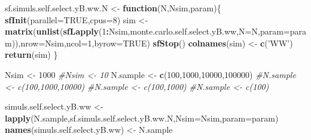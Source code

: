 \documentclass[]{book}
\newenvironment{Shaded}{\begin{snugshade}}{\end{snugshade}}
\newcommand{\KeywordTok}[1]{\textcolor[rgb]{0.13,0.29,0.53}{\textbf{#1}}}
\newcommand{\DataTypeTok}[1]{\textcolor[rgb]{0.13,0.29,0.53}{#1}}
\newcommand{\DecValTok}[1]{\textcolor[rgb]{0.00,0.00,0.81}{#1}}
\newcommand{\StringTok}[1]{\textcolor[rgb]{0.31,0.60,0.02}{#1}}
\newcommand{\CommentTok}[1]{\textcolor[rgb]{0.56,0.35,0.01}{\textit{#1}}}
\newcommand{\OtherTok}[1]{\textcolor[rgb]{0.56,0.35,0.01}{#1}}
\newcommand{\ControlFlowTok}[1]{\textcolor[rgb]{0.13,0.29,0.53}{\textbf{#1}}}
\newcommand{\OperatorTok}[1]{\textcolor[rgb]{0.81,0.36,0.00}{\textbf{#1}}}
\newcommand{\NormalTok}[1]{#1}
\theoremstyle{definition}
\theoremstyle{definition}
\theoremstyle{definition}
\theoremstyle{remark}
\begin{document}
\begin{Shaded}
\begin{Highlighting}[]
\NormalTok{sf.simuls.self.select.yB.ww.N <-}\StringTok{ }\ControlFlowTok{function}\NormalTok{(N,Nsim,param)\{}
  \KeywordTok{sfInit}\NormalTok{(}\DataTypeTok{parallel=}\OtherTok{TRUE}\NormalTok{,}\DataTypeTok{cpus=}\DecValTok{8}\NormalTok{)}
\NormalTok{  sim <-}\StringTok{ }\KeywordTok{matrix}\NormalTok{(}\KeywordTok{unlist}\NormalTok{(}\KeywordTok{sfLapply}\NormalTok{(}\DecValTok{1}\OperatorTok{:}\NormalTok{Nsim,monte.carlo.self.select.yB.ww,}\DataTypeTok{N=}\NormalTok{N,}\DataTypeTok{param=}\NormalTok{param)),}\DataTypeTok{nrow=}\NormalTok{Nsim,}\DataTypeTok{ncol=}\DecValTok{1}\NormalTok{,}\DataTypeTok{byrow=}\OtherTok{TRUE}\NormalTok{)}
  \KeywordTok{sfStop}\NormalTok{()}
  \KeywordTok{colnames}\NormalTok{(sim) <-}\StringTok{ }\KeywordTok{c}\NormalTok{(}\StringTok{'WW'}\NormalTok{)}
  \KeywordTok{return}\NormalTok{(sim)}
\NormalTok{\}}

\NormalTok{Nsim <-}\StringTok{ }\DecValTok{1000}
\CommentTok{#Nsim <- 10}
\NormalTok{N.sample <-}\StringTok{ }\KeywordTok{c}\NormalTok{(}\DecValTok{100}\NormalTok{,}\DecValTok{1000}\NormalTok{,}\DecValTok{10000}\NormalTok{,}\DecValTok{100000}\NormalTok{)}
\CommentTok{#N.sample <- c(100,1000,10000)}
\CommentTok{#N.sample <- c(100,1000)}
\CommentTok{#N.sample <- c(100)}

\NormalTok{simuls.self.select.yB.ww <-}\StringTok{ }\KeywordTok{lapply}\NormalTok{(N.sample,sf.simuls.self.select.yB.ww.N,}\DataTypeTok{Nsim=}\NormalTok{Nsim,}\DataTypeTok{param=}\NormalTok{param)}
\KeywordTok{names}\NormalTok{(simuls.self.select.yB.ww) <-}\StringTok{ }\NormalTok{N.sample}
\end{Highlighting}
\end{Shaded}
\end{document}
